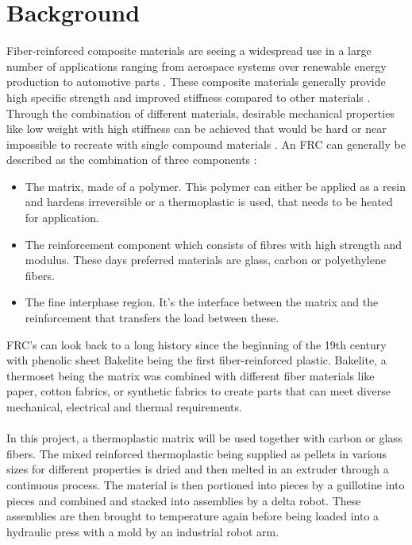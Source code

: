 
\chapter{Background}

Fiber-reinforced composite materials are seeing a widespread use in a large number of applications ranging from aerospace systems over renewable energy production to automotive parts \cite{park2011interface} \cite{HighPerformanceTextiles}. 
These composite materials generally provide high specific strength and improved stiffness compared to other materials \cite{GeneralizedContinuumMechanics}. 
Through the combination of different materials, desirable mechanical properties like low weight with high stiffness can be achieved that would be hard or near impossible to recreate with single compound materials \cite{AdvancesDamageMechanics}. 
An FRC can generally be described as the combination of three components \cite{AdvancedDentalBiomaterials}: \\
\begin{itemize}
	\item The matrix, made of a polymer. 
	This polymer can either be applied as a resin and hardens irreversible or a thermoplastic is used, that needs to be heated for application.
	\item The reinforcement component which consists of fibres with high strength and modulus. 
	These days preferred materials are glass, carbon or polyethylene fibers.
	\item The fine interphase region. 
	It's the interface between the matrix and the reinforcement that transfers the load between these.	
\end{itemize}
%
FRC's can look back to a long history since the beginning of the 19th century with phenolic sheet Bakelite being the first fiber-reinforced plastic. 
Bakelite, a thermoset being the matrix was combined with different fiber materials like paper, cotton fabrics, or synthetic fabrics to create parts that can meet diverse mechanical, electrical and thermal requirements.
\cite{BakelitePhenolics}\\
\\
In this project, a thermoplastic matrix will be used together with carbon or glass fibers. 
The mixed reinforced thermoplastic being supplied as pellets in various sizes for different properties is dried and then melted in an extruder through a continuous process. 
The material is then portioned into pieces by a guillotine into pieces and combined and stacked into assemblies by a delta robot. 
These assemblies are then brought to temperature again before being loaded into a hydraulic press with a mold by an industrial robot arm.
\cite{SystemRequirements}





